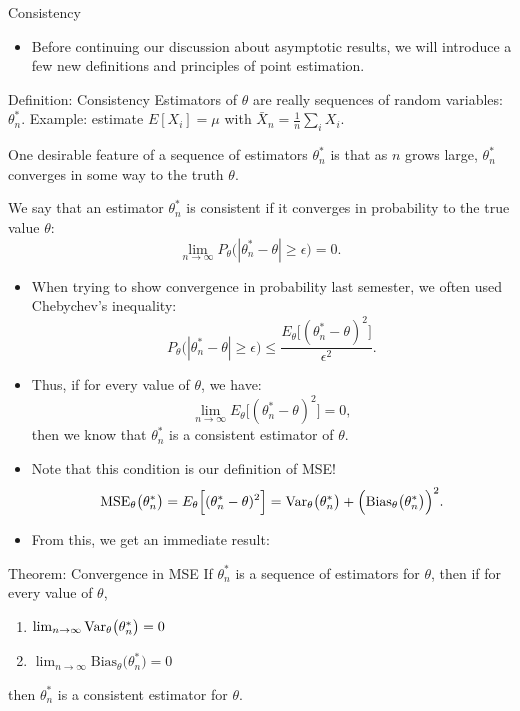   \begin{frame}[allowframebreaks]{Consistency}

  \begin{itemize}
    \item Before continuing our discussion about asymptotic results, we will introduce a few new definitions and principles of point estimation.
  \end{itemize}

  \begin{block}{Definition: Consistency}
    Estimators of $\theta$ are really sequences of random variables: $\theta^*_n$. Example: estimate $E[X_i] = \mu$ with $\bar{X}_n = \frac{1}{n}\sum_i X_i$.

    One desirable feature of a sequence of estimators $\theta^*_n$ is that as $n$ grows large, $\theta^*_n$ converges in some way to the truth $\theta$.

    We say that an estimator $\theta^*_n$ is \alert{consistent} if it converges in probability to the true value $\theta$:
    $$
    \lim_{n\rightarrow \infty} P_\theta\big(|\theta^*_n - \theta| \geq \epsilon \big) = 0.
    $$
  \end{block}

  \begin{itemize}
    \item When trying to show convergence in probability last semester, we often used Chebychev's inequality:
    $$
    P_\theta\big(|\theta^*_n - \theta| \geq \epsilon \big) \leq \frac{E_\theta\Big[(\theta_n^* - \theta)^2\Big]}{\epsilon^2}.
    $$
    \item Thus, if for every value of $\theta$, we have:
    $$
    \lim_{n \rightarrow \infty} E_\theta\Big[(\theta_n^* - \theta)^2\Big] = 0,
    $$
    then we know that $\theta_n^*$ is a consistent estimator of $\theta$.
    \item Note that this condition is our definition of MSE!
    $$
    \text{MSE}_\theta\big(\theta^*_n\big) =  E_\theta\Big[(\theta_n^* - \theta)^2\Big] = \mathrm{Var}_\theta\big(\theta_n^*\big) + \Big(\text{Bias}_\theta\big(\theta_n^*\big)\Big)^2.
    $$
    \item From this, we get an immediate result:
  \end{itemize}

  \begin{block}{Theorem: Convergence in MSE}
    If $\theta^*_n$ is a sequence of estimators for $\theta$, then if for every value of $\theta$,
    \begin{enumerate}
      \item $\lim_{n \rightarrow \infty} \mathrm{Var}_\theta\big(\theta^*_n\big) = 0$
      \item $\lim_{n \rightarrow \infty} \text{Bias}_\theta\big(\theta^*_n\big) = 0$
    \end{enumerate}
    then $\theta^*_n$ is a consistent estimator for $\theta$.
  \end{block}


\end{frame}
